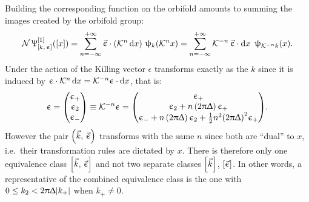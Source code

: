 Building the corresponding function on the orbifold amounts to summing the images created by the orbifold group:
\begin{equation}
  \begin{split}
    \mathcal{N}\,
    \Uppsi^{[1]}_{[k,\, \upepsilon]}\qty(\qty[x])
    =
    \sum\limits_{n = -\infty}^{+\infty}
    \vec{\upepsilon} \cdot \qty( \mathcal{K}^n \dd{x})~
    \uppsi_{k}\qty( \mathcal{K}^n x)
    =
    \sum\limits_{n = -\infty}^{+\infty}
    \mathcal{K}^{-n}\,
    \vec{\upepsilon} \cdot \dd{x}~
    \uppsi_{\mathcal{K}^{-n} k}\qty(x).
  \end{split}
\end{equation}
Under the action of the Killing vector $\epsilon$ transforms exactly as the $k$ since it is induced by $\upepsilon \cdot \mathcal{K}^n \dd{x} = \mathcal{K}^{-n} \upepsilon \cdot \dd{x}$, that is:
\begin{equation}
  \epsilon
  =
  \mqty( \epsilon_+ \\ \epsilon_2 \\ \epsilon_- )
  \equiv
  \cK^{-n} \epsilon
  =
  \mqty(%
    \epsilon_+ 
    \\
    \epsilon_2 + n\, \qty(2 \pi \Delta)\, \epsilon_+
    \\ 
    \epsilon_- + n\, \qty(2 \pi \Delta)\, \epsilon_2 + \frac{1}{2} n^2 \qty(2 \pi \Delta)^2 \epsilon_+
  ).
\end{equation}
However the pair $\qty(\vec{k},\, \vec{\upepsilon})$ transforms with the same $n$ since both are ``dual'' to $x$, i.e.\ their transformation rules are dictated by $x$.
There is therefore only one equivalence class $\qty[\vec{k},\, \vec{\upepsilon}]$ and not two separate classes $\qty[\vec{k}]$, $\qty[\vec{\upepsilon}]$.
In other words, a representative of the combined equivalence class is the one with $0 \le k_2 < 2 \uppi \Updelta \abs{k_+}$ when $k_+ \neq 0$. 

